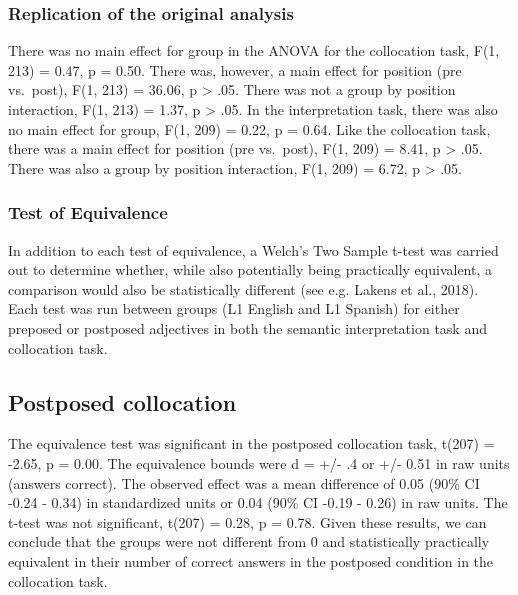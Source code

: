 \documentclass[
  man]{apa6}
\begin{document}
\hypertarget{replication-of-the-original-analysis}{%
\subsubsection{Replication of the original analysis}\label{replication-of-the-original-analysis}}

There was no main effect for group in the ANOVA for the collocation task, F(1, 213) = 0.47, p = 0.50.
There was, however, a main effect for position (pre vs.~post), F(1, 213) = 36.06, p \textgreater{} .05.
There was not a group by position interaction, F(1, 213) = 1.37, p \textgreater{} .05.
In the interpretation task, there was also no main effect for group, F(1, 209) = 0.22, p = 0.64.
Like the collocation task, there was a main effect for position (pre vs.~post), F(1, 209) = 8.41, p \textgreater{} .05.
There was also a group by position interaction, F(1, 209) = 6.72, p \textgreater{} .05.

\hypertarget{test-of-equivalence}{%
\subsubsection{Test of Equivalence}\label{test-of-equivalence}}

In addition to each test of equivalence, a Welch's Two Sample t-test was carried out to determine whether, while also potentially being practically equivalent, a comparison would also be statistically different (see e.g. Lakens et al., 2018).
Each test was run between groups (L1 English and L1 Spanish) for either preposed or postposed adjectives in both the semantic interpretation task and collocation task.

\hypertarget{postposed-collocation}{%
\subsection{Postposed collocation}\label{postposed-collocation}}

The equivalence test was significant in the postposed collocation task, t(207) = -2.65, p = 0.00.
The equivalence bounds were d = +/- .4 or +/- 0.51 in raw units (answers correct).
The observed effect was a mean difference of 0.05 (90\% CI -0.24 - 0.34) in standardized units or 0.04 (90\% CI -0.19 - 0.26) in raw units.
The t-test was not significant, t(207) = 0.28, p = 0.78.
Given these results, we can conclude that the groups were not different from 0 and statistically practically equivalent in their number of correct answers in the postposed condition in the collocation task.
\end{document}
